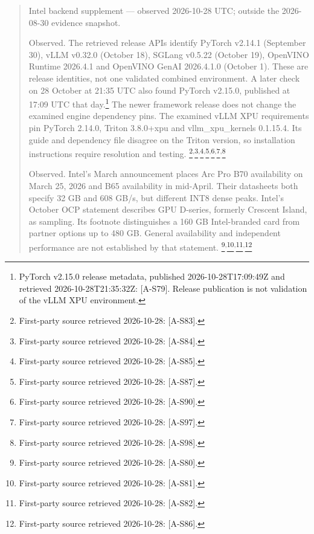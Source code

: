 \begin{quote}
Intel backend supplement --- observed 2026-10-28 UTC; outside the
2026-08-30 evidence snapshot.

Observed. The retrieved release APIs identify PyTorch v2.14.1 (September
30), vLLM v0.32.0 (October 18), SGLang v0.5.22 (October 19), OpenVINO
Runtime 2026.4.1 and OpenVINO GenAI 2026.4.1.0 (October 1). These are
release identities, not one validated combined environment. A later
check on 28 October at 21:35 UTC also found PyTorch v2.15.0, published
at 17:09 UTC that day.\footnote{PyTorch v2.15.0 release metadata,
  published 2026-10-28T17:09:49Z and retrieved 2026-10-28T21:35:32Z:
  \mbox{{[}A-S79{]}}. Release publication is not validation of the vLLM XPU
  environment.} The newer framework release does not change the examined
engine dependency pins. The examined vLLM XPU requirements pin PyTorch
2.14.0, Triton 3.8.0+xpu and vllm\_xpu\_kernels 0.1.15.4. Its guide and
dependency file disagree on the Triton version, so installation
instructions require resolution and testing.
\footnote{First-party source retrieved 2026-10-28: \mbox{{[}A-S83{]}}.}\textsuperscript{,}\footnote{First-party
  source retrieved 2026-10-28: \mbox{{[}A-S84{]}}.}\textsuperscript{,}\footnote{First-party
  source retrieved 2026-10-28: \mbox{{[}A-S85{]}}.}\textsuperscript{,}\footnote{First-party
  source retrieved 2026-10-28: \mbox{{[}A-S87{]}}.}\textsuperscript{,}\footnote{First-party
  source retrieved 2026-10-28: \mbox{{[}A-S90{]}}.}\textsuperscript{,}\footnote{First-party
  source retrieved 2026-10-28: \mbox{{[}A-S97{]}}.}\textsuperscript{,}\footnote{First-party
  source retrieved 2026-10-28: \mbox{{[}A-S98{]}}.}

Observed. Intel's March announcement places Arc Pro B70 availability on
March 25, 2026 and B65 availability in mid-April. Their datasheets both
specify 32 GB and 608 GB/s, but different INT8 dense peaks. Intel's
October OCP statement describes GPU D-series, formerly Crescent Island,
as sampling. Its footnote distinguishes a 160 GB Intel-branded card from
partner options up to 480 GB. General availability and independent
performance are not established by that statement.
\footnote{First-party source retrieved 2026-10-28: \mbox{{[}A-S80{]}}.}\textsuperscript{,}\footnote{First-party
  source retrieved 2026-10-28: \mbox{{[}A-S81{]}}.}\textsuperscript{,}\footnote{First-party
  source retrieved 2026-10-28: \mbox{{[}A-S82{]}}.}\textsuperscript{,}\footnote{First-party
  source retrieved 2026-10-28: \mbox{{[}A-S86{]}}.}


\end{quote}
